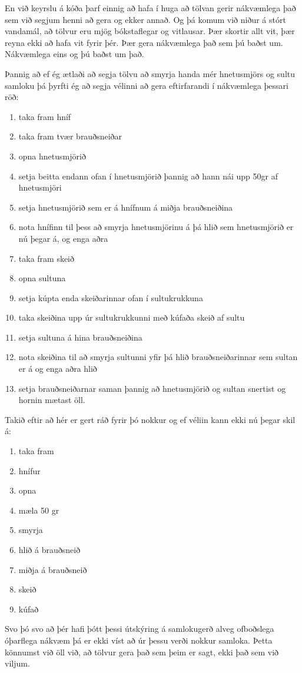 En við keyrslu á kóða þarf einnig að hafa í huga að tölvan gerir nákvæmlega það sem við segjum henni að gera og ekker annað.
Og þá komum við niður á stórt vandamál, að tölvur eru mjög bókstaflegar og vitlausar.
Þær skortir allt vit, þær reyna ekki að hafa vit fyrir þér. 
Þær gera nákvæmlega það sem þú baðst um.
Nákvæmlega eins og þú baðst um það.

Þannig að ef ég ætlaði að segja tölvu að smyrja handa mér hnetusmjörs og sultu samloku þá þyrfti ég að segja vélinni að gera eftirfarandi í nákvæmlega þessari röð:
\vspace{0.4cm}
\begin{enumerate}
	\item taka fram hníf
	\item taka fram tvær brauðsneiðar
	\item opna hnetusmjörið
	\item setja beitta endann ofan í hnetusmjörið þannig að hann nái upp 50gr af hnetusmjöri
	\item setja hnetusmjörið sem er á hnífnum á miðja brauðsneiðina
	\item nota hnífinn til þess að smyrja hnetusmjörinu á þá hlið sem hnetusmjörið er nú þegar á, og enga aðra
	\item taka fram skeið
	\item opna sultuna
	\item setja kúpta enda skeiðarinnar ofan í sultukrukkuna 
	\item taka skeiðina upp úr sultukrukkunni með kúfaða skeið af sultu
	\item setja sultuna á hina brauðsneiðina
	\item nota skeiðina til að smyrja sultunni yfir þá hlið brauðsneiðarinnar sem sultan er á og enga aðra hlið
	\item  setja brauðsneiðarnar saman þannig að hnetusmjörið og sultan snertist og hornin mætast öll. 
\end{enumerate} 
\vspace{0.4cm}
Takið eftir að hér er gert ráð fyrir þó nokkur og ef véliin kann ekki nú þegar skil á: 
\vspace{0.2cm}
\begin{enumerate}
	\item taka fram
	\item hnífur
	\item opna
	\item mæla 50 gr
	\item smyrja
	\item hlið á brauðsneið
	\item miðja á brauðsneið
	\item skeið
	\item kúfað
\end{enumerate} 
\vspace{0.2cm}
Svo þó svo að þér hafi þótt þessi útskýring á samlokugerð alveg ofboðslega óþarflega nákvæm þá er ekki víst að úr þessu verði nokkur samloka.
Þetta könnumst við öll við, að tölvur gera það sem þeim er sagt, ekki það sem við viljum.

